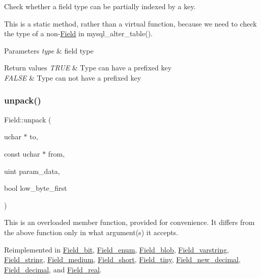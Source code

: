 Check whether a field type can be partially indexed by a key.

This is a static method, rather than a virtual function, because we need to check the type of a non-\/\mbox{\hyperlink{classField}{Field}} in mysql\+\_\+alter\+\_\+table().


\begin{DoxyParams}{Parameters}
{\em type} & field type\\
\hline
\end{DoxyParams}

\begin{DoxyRetVals}{Return values}
{\em T\+R\+UE} & Type can have a prefixed key \\
\hline
{\em F\+A\+L\+SE} & Type can not have a prefixed key \\
\hline
\end{DoxyRetVals}
\mbox{\label{classField_a42f448ff2c939d91949f7635d939b16b}} 
\subsubsection{\texorpdfstring{unpack()}{unpack()}}
{\footnotesize\ttfamily Field\+::unpack (\begin{DoxyParamCaption}\item[{uchar $\ast$}]{to,  }\item[{const uchar $\ast$}]{from,  }\item[{uint}]{param\+\_\+data,  }\item[{bool}]{low\+\_\+byte\+\_\+first }\end{DoxyParamCaption})\hspace{0.3cm}{\ttfamily [virtual]}}

This is an overloaded member function, provided for convenience. It differs from the above function only in what argument(s) it accepts.

Reimplemented in \mbox{\hyperlink{classField__bit_ae770942d4124955fc0e4cfae31ea932d}{Field\+\_\+bit}}, \mbox{\hyperlink{classField__enum_a94bb8c13a4729eb7be3acf8d3c59904c}{Field\+\_\+enum}}, \mbox{\hyperlink{classField__blob_a1dc550d11713918f94f12abe0fd36caa}{Field\+\_\+blob}}, \mbox{\hyperlink{classField__varstring_a2e40451e305ae25227d1aea8af1ee083}{Field\+\_\+varstring}}, \mbox{\hyperlink{classField__string_a2b13c788916d9efdb0683d9c92b0ccbf}{Field\+\_\+string}}, \mbox{\hyperlink{classField__medium_aa04c697b728c9f1f6c92164d85894030}{Field\+\_\+medium}}, \mbox{\hyperlink{classField__short_ab017d92c943d172dd8f6691e6657cf7d}{Field\+\_\+short}}, \mbox{\hyperlink{classField__tiny_a1be4d9de39cf9efe57b276614f8f1bf9}{Field\+\_\+tiny}}, \mbox{\hyperlink{classField__new__decimal_a62e2be62b919a9917874a4877fc924d9}{Field\+\_\+new\+\_\+decimal}}, \mbox{\hyperlink{classField__decimal_a175db70d41ae30df50a1ec04d8680363}{Field\+\_\+decimal}}, and \mbox{\hyperlink{classField__real_aab922b4da48c1fd508344b1f627e0e0e}{Field\+\_\+real}}.

